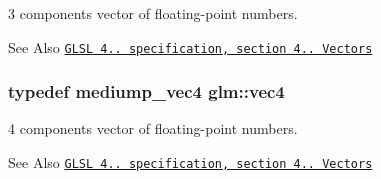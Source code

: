 3 components vector of floating-\/point numbers. 

\begin{DoxySeeAlso}{See Also}
\href{http://www.opengl.org/registry/doc/GLSLangSpec.4.20.8.pdf}{\tt G\-L\-S\-L 4.. specification, section 4.. Vectors} 
\end{DoxySeeAlso}
\hypertarget{group__core__types_gae9c89157f980f7247cdee8bf55787035}{
\subsubsection[{vec4}]{\setlength{\rightskip}{0pt plus 5cm}typedef mediump\-\_\-vec4 {\bf glm\-::vec4}}}\label{group__core__types_gae9c89157f980f7247cdee8bf55787035}


4 components vector of floating-\/point numbers. 

\begin{DoxySeeAlso}{See Also}
\href{http://www.opengl.org/registry/doc/GLSLangSpec.4.20.8.pdf}{\tt G\-L\-S\-L 4.. specification, section 4.. Vectors} 
\end{DoxySeeAlso}
